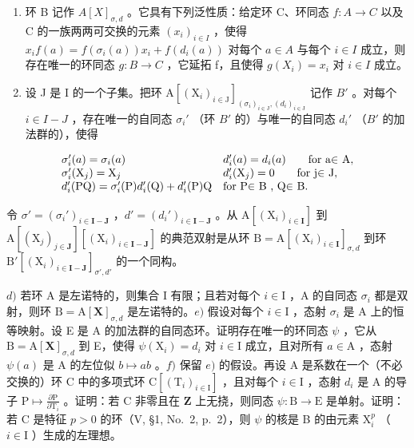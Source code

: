 \begin{enumerate}
\def\labelenumi{\alph{enumi})}
\setcounter{enumi}{1}
\item
  环 B 记作 \(A[X]_{\sigma,d}\) 。它具有下列泛性质：给定环 C、环同态 \(f: A \to C\) 以及 C 的一族两两可交换的元素 \((x_i)_{i \in I}\) ，使得 \(x_i f(a) = f(\sigma_i(a)) x_i + f(d_i(a))\) 对每个 \(a \in A\) 与每个 \(i \in I\) 成立，则存在唯一的环同态 \(g: B \to C\) ，它延拓 f，且使得 \(g(X_i) = x_i\) 对 \(i \in I\) 成立。
\item
  设 J 是 I 的一个子集。把环 \(\mathrm{A}[(\mathrm{X}_{i})_{i\in\mathrm{J}}]_{(\sigma_{i})_{i\in\mathrm{J}},(d_{i})_{i\in\mathrm{J}}}\) 记作 \(B'\) 。对每个 \(i\in I-J\) ，存在唯一的自同态 \(\sigma_{i}'\) （环 \(B'\) 的）与唯一的自同态 \(d_{i}'\) （\(B'\) 的加法群的），使得
\end{enumerate}

\[
\begin{array}{l l} \sigma_ {i} ^ {\prime} (a) = \sigma_ {i} (a) & d _ {i} ^ {\prime} (a) = d _ {i} (a) \qquad \text {for a\ensuremath{\in} A}, \\ \sigma_ {i} ^ {\prime} (\mathrm{X} _ {j}) = \mathrm{X} _ {j} & d _ {i} ^ {\prime} (\mathrm{X} _ {j}) = 0 \qquad \text {for j\ensuremath{\in} J}, \\ d _ {i} ^ {\prime} (\mathrm{PQ}) = \sigma_ {i} ^ {\prime} (\mathrm{P}) d _ {i} ^ {\prime} (\mathrm{Q}) + d _ {i} ^ {\prime} (\mathrm{P}) \mathrm{Q} & \text {for P\ensuremath{\in} B , Q\ensuremath{\in} B}. \end{array}
\]

令 \(\sigma' = (\sigma_i')_{i \in \mathbf{I} - \mathbf{J}}\) ，\(d' = (d_i')_{i \in \mathbf{I} - \mathbf{J}}\) 。从 \(\mathrm{A}[(\mathrm{X}_i)_{i \in \mathbf{I}}]\) 到 \(\mathrm{A}[(\mathrm{X}_j)_{j \in \mathbf{J}}][(\mathrm{X}_i)_{i \in \mathbf{I} - \mathbf{J}}]\) 的典范双射是从环 \(\mathrm{B} = \mathrm{A}[(\mathrm{X}_i)_{i \in \mathbf{I}}]_{\sigma, d}\) 到环 \(\mathrm{B}'[(\mathrm{X}_i)_{i \in \mathbf{I} - \mathbf{J}}]_{\sigma', d'}\) 的一个同构。

\(d)\) 若环 A 是左诺特的，则集合 I 有限；且若对每个 \(i \in \mathrm{I}\) ，A 的自同态 \(\sigma_i\) 都是双射，则环 \(\mathrm{B} = \mathrm{A}[\mathbf{X}]_{\sigma,d}\) 是左诺特的。\(e)\) 假设对每个 \(i \in \mathrm{I}\) ，态射 \(\sigma_i\) 是 A 上的恒等映射。设 E 是 A 的加法群的自同态环。证明存在唯一的环同态 \(\psi\) ，它从 \(\mathrm{B} = \mathrm{A}[\mathbf{X}]_{\sigma,d}\) 到 E，使得 \(\psi(\mathrm{X}_i) = d_i\) 对 \(i \in \mathrm{I}\) 成立，且对所有 \(a \in \mathrm{A}\) ，态射 \(\psi(a)\) 是 A 的左位似 \(b \mapsto ab\) 。\(f)\) 保留 \(e)\) 的假设。再设 A 是系数在一个（不必交换的）环 C 中的多项式环 \(\mathrm{C}[(\mathrm{T}_i)_{i \in \mathrm{I}}]\) ，且对每个 \(i \in \mathrm{I}\) ，态射 \(d_i\) 是 A 的导子 \(\mathrm{P} \mapsto \frac{\partial\mathrm{P}}{\partial\mathrm{T}_i}\) 。证明：若 C 非零且在 \(\mathbf{Z}\) 上无挠，则同态 \(\psi: \mathrm{B} \to \mathrm{E}\) 是单射。证明：若 C 是特征 \(p > 0\) 的环（V, §1, No.~2, p.~2），则 \(\psi\) 的核是 B 的由元素 \(\mathrm{X}_i^p\) （ \(i \in \mathrm{I}\) ）生成的左理想。

